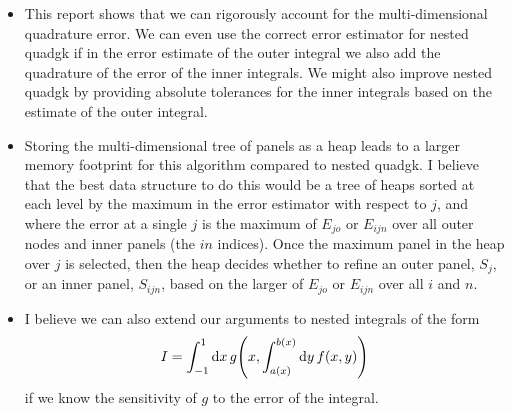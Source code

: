 \documentclass{article}
\begin{document}
\begin{itemize}

\item    This report shows that we can rigorously account for the multi-dimensional
quadrature error. We can even use the correct error estimator for nested quadgk
if in the error estimate of the outer integral we also add the quadrature of the
error of the inner integrals. We might also improve nested quadgk by providing
absolute tolerances for the inner integrals based on the estimate of the outer
integral.

\item    Storing the multi-dimensional tree of panels as a heap leads to a
larger memory footprint for this algorithm compared to nested quadgk. I believe
that the best data structure to do this would be a tree of heaps sorted at each
level by the maximum in the error estimator with respect to $j$, and where the
error at a single $j$ is the maximum of $E_{jo}$ or $E_{ijn}$ over all
outer nodes and inner panels (the $in$ indices). Once the maximum panel in the
heap over $j$ is selected, then the heap decides whether to refine an outer
panel, $S_j$, or an inner panel, $S_{ijn}$, based on the larger of $E_{jo}$ or
$E_{ijn}$ over all $i$ and $n$.

\item    I believe we can also extend our arguments to nested integrals of the form
\begin{align}
    I = \int_{-1}^{1} \dd{x} g\qty(x, \int_{a(x)}^{b(x)} \dd{y} f(x,y))
\end{align}
if we know the sensitivity of $g$ to the error of the integral.
\end{itemize}
\end{document}
